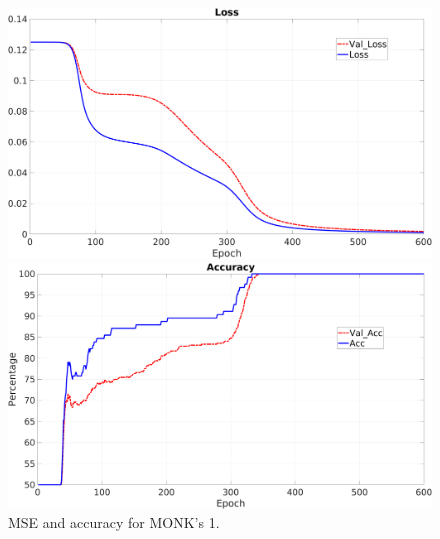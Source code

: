 \begin{figure}[H]
    \centering
    \begin{minipage}[t]{0.5\linewidth}
        \includegraphics[width=\linewidth]{img/Monk1_loss.png}
    \end{minipage}%
    \begin{minipage}[t]{0.5\linewidth}
        \includegraphics[width=\linewidth]{img/Monk1_accuracy.png}
    \end{minipage}
    \caption{MSE and accuracy for MONK’s 1.}
\end{figure}

